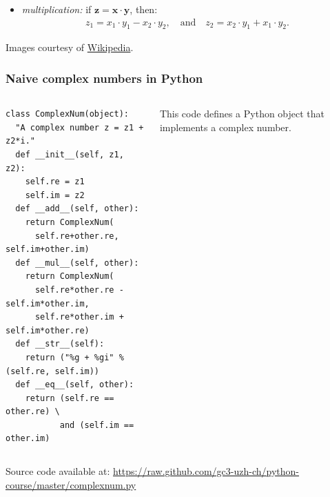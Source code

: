 \documentclass[english,serif,mathserif,xcolor=pdftex,dvipsnames,table]{beamer}
\begin{document}
\begin{frame}
\begin{itemize}
  \item
    \emph{multiplication:} if $\mathbf{z} = \mathbf{x} \cdot
    \mathbf{y}$, then:
    \begin{gather*}
      z_1 = x_1\cdot y_1 - x_2 \cdot y_2,
      \quad\text{and}\quad
      z_2 = x_2\cdot y_1 + x_1\cdot y_2.
    \end{gather*}

  \end{itemize}

  \begin{references}
    Images courtesy of \href{http://en.wikipedia.org/wiki/Complex_number}{Wikipedia}.
  \end{references}
\end{frame}


\begin{frame}[fragile]
  \frametitle{Naive complex numbers in Python}
  \begin{columns}[t]
    \begin{column}{0.5\textwidth}
\begin{lstlisting}[showstringspaces=false]
class ComplexNum(object):
  "A complex number z = z1 + z2*i."
  def __init__(self, z1, z2):
    self.re = z1
    self.im = z2
  def __add__(self, other):
    return ComplexNum(
      self.re+other.re, self.im+other.im)
  def __mul__(self, other):
    return ComplexNum(
      self.re*other.re - self.im*other.im,
      self.re*other.im + self.im*other.re)
  def __str__(self):
    return ("%g + %gi" % (self.re, self.im))
  def __eq__(self, other):
    return (self.re == other.re) \
           and (self.im == other.im)
\end{lstlisting}
    \end{column}
    \begin{column}{0.5\textwidth}
      \raggedleft
      This code defines a Python object that implements a complex number.
    \end{column}
  \end{columns}

  \+
  {\scriptsize Source code available at:
    \url{https://raw.github.com/gc3-uzh-ch/python-course/master/complexnum.py}}
\end{frame}
\end{document}
